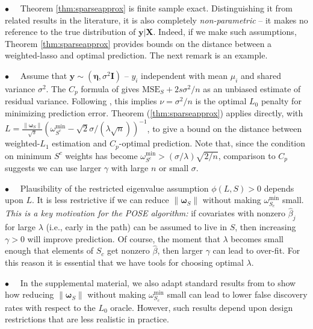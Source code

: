 \documentclass[12pt]{article}
\newcommand{\bs}[1]{\boldsymbol{#1}}
\newcommand{\mr}[1]{\mathrm{#1}}
\newcommand{\bm}[1]{\mathbf{#1}}
\begin{document}


\noindent $\bullet$~~  Theorem \ref{thm:sparseapprox} is finite sample exact.  Distinguishing it from
related results in the literature, it is  also completely
\textit{non-parametric} -- it makes no reference to the true distribution of
$\bm{y}|\bm{X}$.  Indeed, if we make such assumptions, Theorem
\ref{thm:sparseapprox} provides bounds on the distance between a
weighted-lasso and optimal prediction.  The next remark is an example.

\noindent $\bullet$~~ Assume that $\bm{y} \sim
(\bs{\eta},\sigma^2\bm{I})$ --  $y_i$ independent with mean $\mu_i$ and shared
variance $\sigma^2$.  The $C_p$ formula of
\cite{mallows_comments_1973} gives 
$\mr{MSE}_S + 2s\sigma^2/n$ as an unbiased estimate of residual variance.
Following \cite{efron_estimation_2004}, this implies $\nu = \sigma^2/n$ is the
optimal $L_0$ penalty for minimizing prediction error. Theorem
(\ref{thm:sparseapprox}) applies directly,  with $L =
\frac{\|\bs{\omega}_S\|}{\sqrt{s}}\left(\omega^{\mr{min}}_{S^c}-
\sqrt{2}\sigma/(\lambda\sqrt{n})\right)^{-1}$, to give a bound on the distance
between weighted-$L_1$ estimation and $C_p$-optimal prediction. Note that,
since the condition on minimum $S^c$ weights has become
$\omega^{\mr{min}}_{S^c} > (\sigma/\lambda)\sqrt{2/n}$, comparison to $C_p$
suggests we can use larger $\gamma$  with large $n$ or small $\sigma$.


\noindent $\bullet$~~  Plausibility of the restricted eigenvalue assumption
$\phi(L,S) > 0$ depends  upon $L$.  It is less restrictive if we can reduce
$\|\bs{\omega}_S\|$ without making $\omega^{\mr{min}}_{S_c}$ small.
\textit{This is a key motivation for the POSE algorithm:} if covariates with
nonzero $\hat \beta_j$ for large $\lambda$ (i.e., early in the path) can be
assumed to live in $S$, then increasing $\gamma >0$ will improve prediction.
Of course, the moment that $\lambda$ becomes small enough that elements of
$S_c$ get nonzero $\hat\beta$, then larger $\gamma$ can lead to over-fit.  For
this reason it is essential that we have tools for choosing  optimal
$\lambda$.

\noindent $\bullet$~~ In the supplemental material,  we also adapt standard
results from \cite{wainwright_sharp_2006,wainwright_sharp_2009} to show how
reducing $\|\bs{\omega}_S\|$ without making $\omega^{\mr{min}}_{S_c}$ small
can lead to lower false discovery rates with respect to the $L_0$ oracle.
However, such results depend upon design restrictions that are less realistic
in practice.
\end{document}
